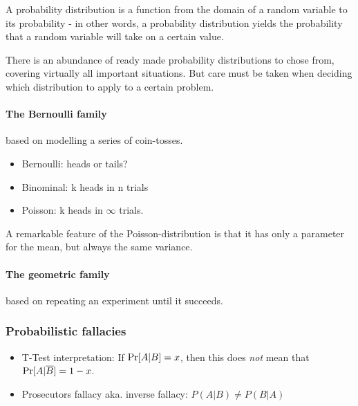 A probability distribution is a function from the domain of a random variable to its probability - in other words, a probability distribution yields the probability that a random variable will take on a certain value. 

There is an abundance of ready made probability distributions to chose from, covering virtually all important situations. But care must be taken when deciding which distribution to apply to a certain problem. 

\paragraph{The Bernoulli family} based on modelling a series of coin-tosses.
\begin{itemize}
    \item Bernoulli: heads or tails?
    \item Binominal: k heads in n trials
    \item Poisson: k heads in $\infty$ trials. 
\end{itemize}
A remarkable feature of the Poisson-distribution is that it has only a parameter for the mean, but always the same variance.

\paragraph{The geometric family} based on repeating an experiment until it succeeds. 



\subsubsection{Probabilistic fallacies}
\begin{itemize}
    \item T-Test interpretation: If $\operatorname{Pr}[A|B] = x$, then this does \emph{not} mean that $\operatorname{Pr}[A|\overline{B}] = 1 - x$.
    \item Prosecutors fallacy aka. inverse fallacy: $P(A|B) \neq P(B|A)$
\end{itemize}

